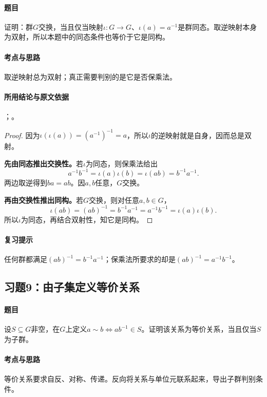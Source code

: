 \paragraph{题目}
证明：群$G$交换，当且仅当映射$\iota:G\to G$、$\iota(a)=a^{-1}$是群同态。取逆映射本身为双射，所以本题中的同态条件也等价于它是同构。

\paragraph{考点与思路}
取逆映射总为双射；真正需要判别的是它是否保乘法。

\paragraph{所用结论与原文依据}
；。


\begin{proof}
因为$\iota(\iota(a))=(a^{-1})^{-1}=a$，所以$\iota$的逆映射就是自身，因而总是双射。

\textbf{先由同态推出交换性。}若$\iota$为同态，则保乘法给出
\[
a^{-1}b^{-1}=\iota(a)\iota(b)=\iota(ab)=b^{-1}a^{-1}.
\]
两边取逆得到$ba=ab$。因$a,b$任意，$G$交换。

\textbf{再由交换性推出同构。}若$G$交换，则对任意$a,b\in G$，
\[
\iota(ab)=(ab)^{-1}=b^{-1}a^{-1}=a^{-1}b^{-1}=\iota(a)\iota(b).
\]
所以$\iota$为同态，再结合双射性，知它是同构。
\end{proof}

\paragraph{复习提示}
任何群都满足$(ab)^{-1}=b^{-1}a^{-1}$；保乘法所要求的却是$(ab)^{-1}=a^{-1}b^{-1}$。


\subsection{习题9：\texorpdfstring{由子集定义等价关系}{由子集定义等价关系}}
\label{ex:1:9}

\paragraph{题目}
设$S\subseteq G$非空，在$G$上定义$a\sim b\iff ab^{-1}\in S$。证明该关系为等价关系，当且仅当$S$为子群。

\paragraph{考点与思路}
等价关系要求自反、对称、传递。反向将关系与单位元联系起来，导出子群判别条件。

